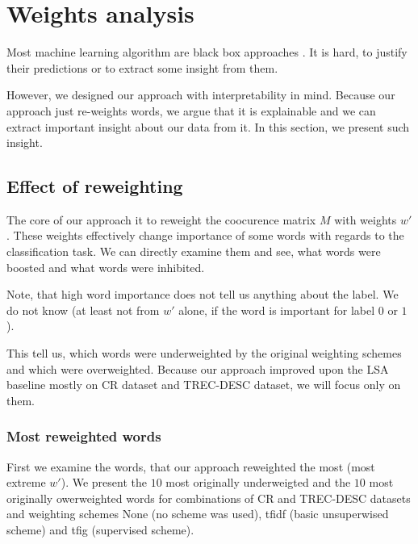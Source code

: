 \section{Weights analysis} \label{chap:weight:analysis}

    Most machine learning algorithm are black box approaches \cite{ribeiro2016should}. %
    It is hard, to justify their predictions or to extract some insight from them. 
    
    However, we designed our approach with interpretability in mind.
    Because our approach just re-weights words, we argue that it is explainable and we can extract important insight about our data from it.
    In this section, we present such insight.
    
    \subsection{Effect of reweighting}
    The core of our approach it to reweight the coocurence matrix $M$ with weights $w'$. 
    These weights effectively change importance of some words with regards to the classification task.
    We can directly examine them and see, what words were boosted and what words were inhibited.
    
    Note, that high word importance does not tell us anything about the label. 
    We do not know (at least not from $w'$ alone, if the word is important for label $0$ or $1$).
    
    This tell us, which words were underweighted by the original weighting schemes and which were overweighted.
    Because our approach improved upon the LSA baseline mostly on CR dataset and TREC-DESC dataset, we will focus only on them.

    \subsubsection{Most reweighted words}
    
    First we examine the words, that our approach reweighted the most (most extreme $w'$).
    We present the $10$ most originally underweigted and the $10$ most originally owerweighted words for combinations of CR and TREC-DESC datasets and weighting schemes None (no scheme was used), tfidf (basic unsuperwised scheme) and tfig (supervised scheme).
    

